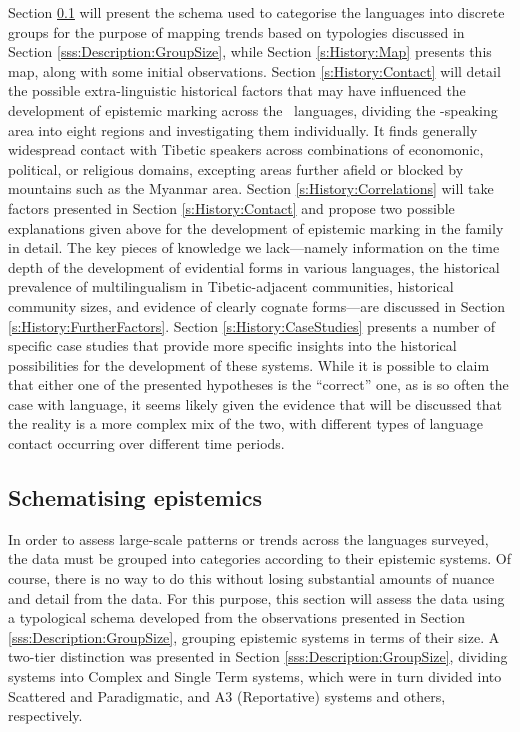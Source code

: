 Section \ref{ss:History:Schema} will present the schema used to categorise the languages into discrete groups for the purpose of mapping trends based on typologies discussed in Section \ref{sss:Description:GroupSize}, while Section \ref{s:History:Map} presents this map, along with some initial observations. Section \ref{s:History:Contact} will detail the possible extra-linguistic historical factors that may have influenced the development of epistemic marking across the \lfam\ languages, dividing the \lfam-speaking area into eight regions and investigating them individually. It finds generally widespread contact with Tibetic speakers across combinations of economonic, political, or religious domains, excepting areas further afield or blocked by mountains such as the Myanmar area. Section \ref{s:History:Correlations} will take factors presented in Section \ref{s:History:Contact} and propose two possible explanations given above for the development of epistemic marking in the family in detail. The key pieces of knowledge we lack---namely information on the time depth of the development of evidential forms in various languages, the historical prevalence of multilingualism in Tibetic-adjacent communities, historical community sizes, and evidence of clearly cognate forms---are discussed in Section \ref{s:History:FurtherFactors}. Section \ref{s:History:CaseStudies} presents a number of specific case studies that provide more specific insights into the historical possibilities for the development of these systems. While it is possible to claim that either one of the presented hypotheses is the ``correct'' one, as is so often the case with language, it seems likely given the evidence that will be discussed that the reality is a more complex mix of the two, with different types of language contact occurring over different time periods.

\subsection{Schematising epistemics}\label{ss:History:Schema}
In order to assess large-scale patterns or trends across the languages surveyed, the data must be grouped into categories according to their epistemic systems. Of course, there is no way to do this without losing substantial amounts of nuance and detail from the data. For this purpose, this section will assess the data using a typological schema developed from the observations presented in Section \ref{sss:Description:GroupSize}, grouping epistemic systems in terms of their size. A two-tier distinction was presented in Section \ref{sss:Description:GroupSize}, dividing systems into Complex and Single Term systems, which were in turn divided into Scattered and Paradigmatic, and A3 (Reportative) systems and others, respectively.

